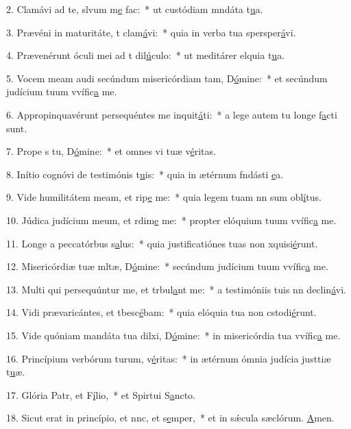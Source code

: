 2. Clamávi ad te, slvum m\uline{e} fac:~* ut custódiam mndáta t\uline{u}a.\par 
3. Prævéni in maturitáte, t clam\uline{á}vi:~* quia in verba tua spersper\uline{á}vi.\par 
4. Prævenérunt óculi mei ad t dil\uline{ú}culo:~* ut meditárer elquia t\uline{u}a.\par 
5. Vocem meam audi secúndum misericórdiam tam, D\uline{ó}mine:~* et secúndum judícium tuum vvífic\uline{a} me.\par 
6. Appropinquavérunt persequéntes me inquit\uline{á}ti:~* a lege autem tu longe f\uline{a}cti sunt.\par 
7. Prope s tu, D\uline{ó}mine:~* et omnes vi tuæ v\uline{é}ritas.\par 
8. Inítio cognóvi de testimónis t\uline{u}is:~* quia in ætérnum fndásti \uline{e}a.\par 
9. Vide humilitátem meam, et rip\uline{e} me:~* quia legem tuam nn sum obl\uline{í}tus.\par 
10. Júdica judícium meum, et rdim\uline{e} me:~* propter elóquium tuum vvífic\uline{a} me.\par 
11. Longe a peccatórbus s\uline{a}lus:~* quia justificatiónes tuas non xquisi\uline{é}runt.\par 
12. Misericórdiæ tuæ mltæ, D\uline{ó}mine:~* secúndum judícium tuum vvífic\uline{a} me.\par 
13. Multi qui persequúntur me, et trbul\uline{a}nt me:~* a testimóniis tuis nn declin\uline{á}vi.\par 
14. Vidi prævaricántes, et tbesc\uline{é}bam:~* quia elóquia tua non cstodi\uline{é}runt.\par 
15. Vide quóniam mandáta tua dilxi, D\uline{ó}mine:~* in misericórdia tua vvífic\uline{a} me.\par 
16. Princípium verbórum turum, v\uline{é}ritas:~* in ætérnum ómnia judícia justtiæ t\uline{u}æ.\par 
17. Glória Patr, et F\uline{í}lio,~* et Spirtui S\uline{a}ncto.\par 
18. Sicut erat in princípio, et nnc, et s\uline{e}mper,~* et in sǽcula sæclórum. \uline{A}men.\par 
